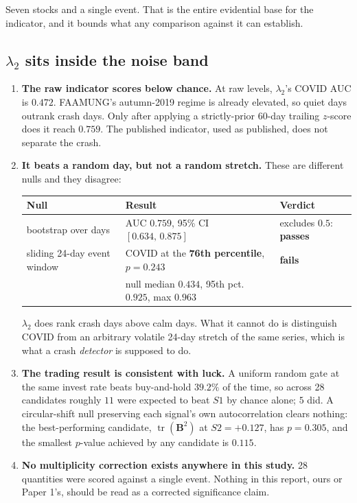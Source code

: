 \documentclass[11pt,a4paper]{article}
\newcommand{\Bmat}{\mathbf{B}}
\begin{document}
Seven stocks and a single event. That is the entire evidential base for the
indicator, and it bounds what any comparison against it can establish.

\subsection*{$\lambda_2$ sits inside the noise band}

\begin{enumerate}[label=\textbf{\alph*.}]
\item \textbf{The raw indicator scores below chance.} At raw levels, $\lambda_2$'s
COVID AUC is $\mathbf{0.472}$. FAAMUNG's autumn-2019 regime is already elevated, so
quiet days outrank crash days. Only after applying a strictly-prior 60-day
trailing $z$-score does it reach $0.759$. The published indicator, used as
published, does not separate the crash.

\item \textbf{It beats a random day, but not a random stretch.} These are different
nulls and they disagree:
\begin{center}\small
\begin{tabular}{@{}lll@{}}
\toprule
\textbf{Null} & \textbf{Result} & \textbf{Verdict} \\
\midrule
bootstrap over days & AUC $0.759$, 95\% CI $[0.634,\,0.875]$ &
excludes $0.5$: \textcolor{LapC}{\textbf{passes}} \\
sliding 24-day event window & COVID at the \textbf{76th percentile},
$p = \mathbf{0.243}$ & \textcolor{BadRed}{\textbf{fails}} \\
& \small null median $0.434$, 95th pct.\ $0.925$, max $0.963$ & \\
\bottomrule
\end{tabular}
\end{center}
$\lambda_2$ does rank crash days above calm days. What it cannot do is
distinguish COVID from an arbitrary volatile 24-day stretch of the same series,
which is what a crash \emph{detector} is supposed to do.

\item \textbf{The trading result is consistent with luck.} A uniform random gate at
the same invest rate beats buy-and-hold $\mathbf{39.2\%}$ of the time, so across 28
candidates roughly $11$ were expected to beat $S1$ by chance alone; $5$ did. A
circular-shift null preserving each signal's own autocorrelation clears nothing:
the best-performing candidate, $\operatorname{tr}(\Bmat^2)$ at $S2=+0.127$, has
$p = 0.305$, and the smallest $p$-value achieved by any candidate is $0.115$.

\item \textbf{No multiplicity correction exists anywhere in this study.} 28
quantities were scored against a single event. Nothing in this report, ours or
Paper 1's, should be read as a corrected significance claim.
\end{enumerate}
\end{document}
